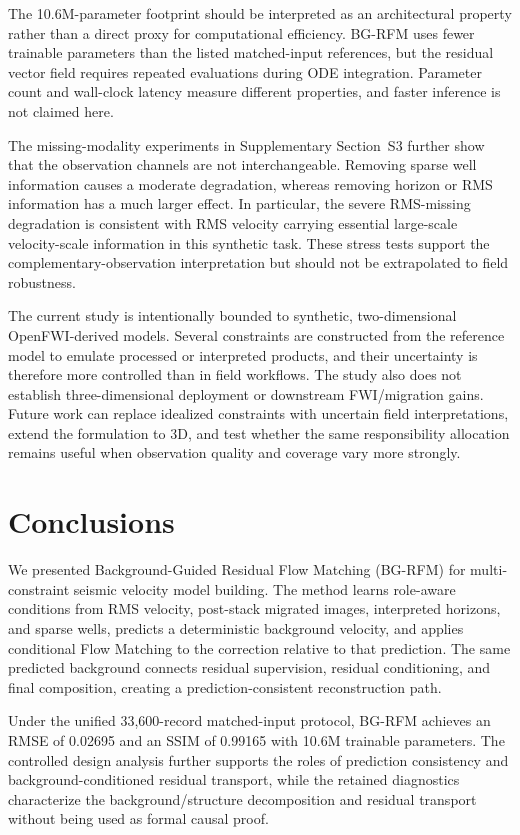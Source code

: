 \documentclass[remotesensing,article,submit,pdftex,moreauthors]{Definitions/mdpi}
\newcommand{\method}{BG-RFM}
\begin{document}
The 10.6M-parameter footprint should be interpreted as an architectural property rather than a direct proxy for computational efficiency. BG-RFM uses fewer trainable parameters than the listed matched-input references, but the residual vector field requires repeated evaluations during ODE integration. Parameter count and wall-clock latency measure different properties, and faster inference is not claimed here.

The missing-modality experiments in Supplementary Section~S3 further show that the observation channels are not interchangeable. Removing sparse well information causes a moderate degradation, whereas removing horizon or RMS information has a much larger effect. In particular, the severe RMS-missing degradation is consistent with RMS velocity carrying essential large-scale velocity-scale information in this synthetic task. These stress tests support the complementary-observation interpretation but should not be extrapolated to field robustness.

The current study is intentionally bounded to synthetic, two-dimensional OpenFWI-derived models. Several constraints are constructed from the reference model to emulate processed or interpreted products, and their uncertainty is therefore more controlled than in field workflows. The study also does not establish three-dimensional deployment or downstream FWI/migration gains. Future work can replace idealized constraints with uncertain field interpretations, extend the formulation to 3D, and test whether the same responsibility allocation remains useful when observation quality and coverage vary more strongly.

\section{Conclusions}

We presented Background-Guided Residual Flow Matching (\method{}) for multi-constraint seismic velocity model building. The method learns role-aware conditions from RMS velocity, post-stack migrated images, interpreted horizons, and sparse wells, predicts a deterministic background velocity, and applies conditional Flow Matching to the correction relative to that prediction. The same predicted background connects residual supervision, residual conditioning, and final composition, creating a prediction-consistent reconstruction path.

Under the unified 33,600-record matched-input protocol, BG-RFM achieves an RMSE of 0.02695 and an SSIM of 0.99165 with 10.6M trainable parameters. The controlled design analysis further supports the roles of prediction consistency and background-conditioned residual transport, while the retained diagnostics characterize the background/structure decomposition and residual transport without being used as formal causal proof.
\end{document}
